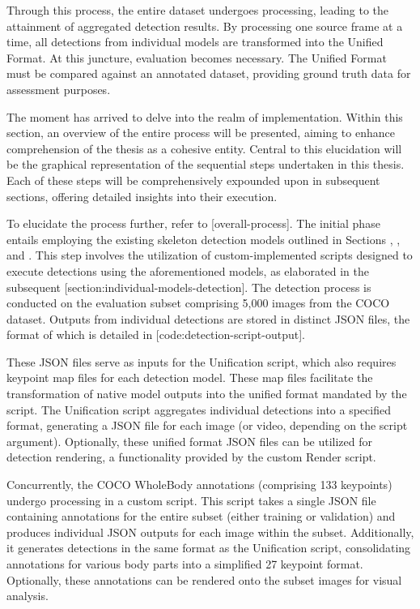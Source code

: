 Through this process, the entire dataset undergoes processing, leading to the attainment of aggregated detection results. By processing one source frame at a time, all detections from individual models are transformed into the Unified Format. At this juncture, evaluation becomes necessary. The Unified Format must be compared against an annotated dataset, providing ground truth data for assessment purposes.


The moment has arrived to delve into the realm of implementation. Within this section, an overview of the entire process will be presented, aiming to enhance comprehension of the thesis as a cohesive entity. Central to this elucidation will be the graphical representation of the sequential steps undertaken in this thesis. Each of these steps will be comprehensively expounded upon in subsequent sections, offering detailed insights into their execution.

To elucidate the process further, refer to [overall-process]. The initial phase entails employing the existing skeleton detection models outlined in Sections , , and . This step involves the utilization of custom-implemented scripts designed to execute detections using the aforementioned models, as elaborated in the subsequent [section:individual-models-detection]. The detection process is conducted on the evaluation subset comprising 5,000 images from the COCO dataset. Outputs from individual detections are stored in distinct JSON files, the format of which is detailed in [code:detection-script-output].

These JSON files serve as inputs for the Unification script, which also requires keypoint map files for each detection model. These map files facilitate the transformation of native model outputs into the unified format mandated by the script. The Unification script aggregates individual detections into a specified format, generating a JSON file for each image (or video, depending on the script argument). Optionally, these unified format JSON files can be utilized for detection rendering, a functionality provided by the custom Render script.

Concurrently, the COCO WholeBody annotations (comprising 133 keypoints) undergo processing in a custom script. This script takes a single JSON file containing annotations for the entire subset (either training or validation) and produces individual JSON outputs for each image within the subset. Additionally, it generates detections in the same format as the Unification script, consolidating annotations for various body parts into a simplified 27 keypoint format. Optionally, these annotations can be rendered onto the subset images for visual analysis.

